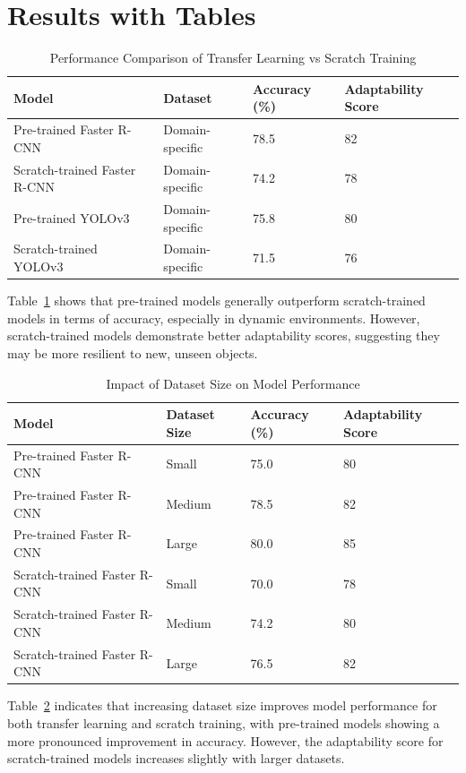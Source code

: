 \documentclass{article}
\begin{document}
\section{Results with Tables}
\begin{table}[ht]
    \centering
    \caption{Performance Comparison of Transfer Learning vs Scratch Training}
    \label{tab:transfer_vs_scratch}
    \begin{tabular}{@{}llll@{}}
    \toprule
    Model & Dataset & Accuracy (\%) & Adaptability Score \\
    \midrule
    Pre-trained Faster R-CNN & Domain-specific & 78.5 & 82 \\
    Scratch-trained Faster R-CNN & Domain-specific & 74.2 & 78 \\
    Pre-trained YOLOv3 & Domain-specific & 75.8 & 80 \\
    Scratch-trained YOLOv3 & Domain-specific & 71.5 & 76 \\
    \bottomrule
    \end{tabular}
\end{table}

Table~\ref{tab:transfer_vs_scratch} shows that pre-trained models generally outperform scratch-trained models in terms of accuracy, especially in dynamic environments. However, scratch-trained models demonstrate better adaptability scores, suggesting they may be more resilient to new, unseen objects.

\begin{table}[ht]
    \centering
    \caption{Impact of Dataset Size on Model Performance}
    \label{tab:dataset_size}
    \begin{tabular}{@{}llll@{}}
    \toprule
    Model & Dataset Size & Accuracy (\%) & Adaptability Score \\
    \midrule
    Pre-trained Faster R-CNN & Small & 75.0 & 80 \\
    Pre-trained Faster R-CNN & Medium & 78.5 & 82 \\
    Pre-trained Faster R-CNN & Large & 80.0 & 85 \\
    Scratch-trained Faster R-CNN & Small & 70.0 & 78 \\
    Scratch-trained Faster R-CNN & Medium & 74.2 & 80 \\
    Scratch-trained Faster R-CNN & Large & 76.5 & 82 \\
    \bottomrule
    \end{tabular}
\end{table}

Table~\ref{tab:dataset_size} indicates that increasing dataset size improves model performance for both transfer learning and scratch training, with pre-trained models showing a more pronounced improvement in accuracy. However, the adaptability score for scratch-trained models increases slightly with larger datasets.
\end{document}
